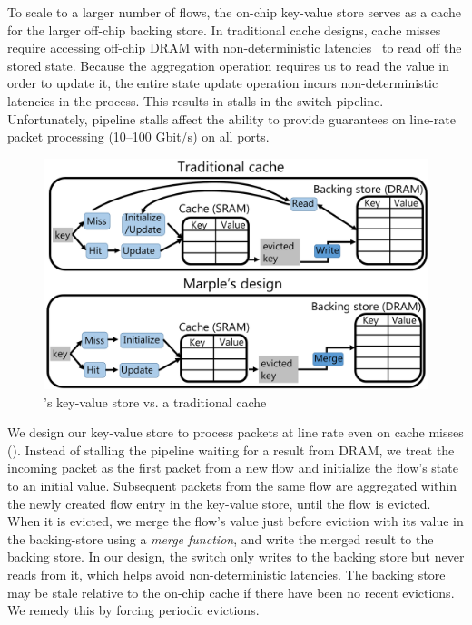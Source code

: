To scale to a larger number of flows, the on-chip key-value store serves as a
cache for the larger off-chip backing store. In traditional cache designs,
cache misses require accessing off-chip DRAM with non-deterministic
latencies~\cite{unpredictable_cache} to read off the stored state. Because the
aggregation operation requires us to read the value in order to update it, the
entire state update operation incurs non-deterministic latencies in the
process.  This results in stalls in the switch pipeline. Unfortunately,
pipeline stalls affect the ability to provide guarantees on line-rate
packet processing (10--100 Gbit/s) on all ports.

\begin{figure}
\includegraphics[width=\columnwidth]{pq_kv_store.pdf}
\caption{\TheSystem's key-value store vs. a traditional cache}
\label{fig:kv}
\end{figure}

We design our key-value store to process packets at line rate even on cache
misses (). Instead of stalling the pipeline waiting for a result from
DRAM, we treat the incoming packet as the first packet from a new flow and
initialize the flow's state to an initial value. Subsequent packets from the
same flow are aggregated within the newly created flow entry in the key-value
store, until the flow is evicted. When it is evicted, we merge the flow's value
just before eviction with its value in the backing-store using a {\em merge
function}, and write the merged result to the backing store. In our design, the
switch only writes to the backing store but never reads from it, which helps
avoid non-deterministic latencies.  The backing store may be
stale relative to the on-chip cache if there have been no recent evictions. We
remedy this by forcing periodic evictions.


